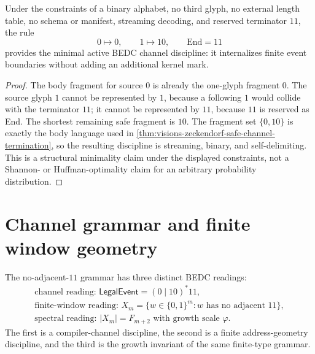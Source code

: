 \begin{corollary}
\label{cor:visions-constraint-minimal-channel-reading}
Under the constraints of a binary alphabet, no third glyph, no external
length table, no schema or manifest, streaming decoding, and reserved
terminator $11$, the rule
$$
0\mapsto 0,
\qquad
1\mapsto 10,
\qquad
\mathrm{End}=11
$$
provides the minimal active BEDC channel discipline: it internalizes
finite event boundaries without adding an additional kernel mark.
\end{corollary}

\begin{proof}
The body fragment for source $0$ is already the one-glyph fragment $0$.
The source glyph $1$ cannot be represented by $1$, because a following
$1$ would collide with the terminator $11$; it cannot be represented by
$11$, because $11$ is reserved as End. The shortest remaining safe
fragment is $10$. The fragment set $\{0,10\}$ is exactly the body
language used in
\autoref{thm:visions-zeckendorf-safe-channel-termination}, so the
resulting discipline is streaming, binary, and self-delimiting. This is
a structural minimality claim under the displayed constraints, not a
Shannon- or Huffman-optimality claim for an arbitrary probability
distribution.
\end{proof}

\section{Channel grammar and finite window geometry}
\label{sec:visions-channel-grammar-window-geometry}

\begin{definition}
\label{def:visions-three-readings-no-adjacent-grammar}
The no-adjacent-$11$ grammar has three distinct BEDC readings:
$$
\begin{gathered}
\text{channel reading: } \mathsf{LegalEvent}=(0\mid10)^*11,\\
\text{finite-window reading: } X_m=\{w\in\{0,1\}^m:w\text{ has no adjacent }11\},\\
\text{spectral reading: } |X_m|=F_{m+2}\text{ with growth scale }\varphi.
\end{gathered}
$$
The first is a compiler-channel discipline, the second is a finite
address-geometry discipline, and the third is the growth invariant of the
same finite-type grammar.
\end{definition}

